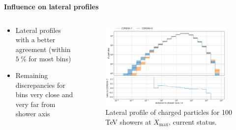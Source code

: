 \documentclass[aspectratio=1610, 9pt]{beamer}
\begin{document}
\begin{frame}
  \textbf{Influence on lateral profiles}
  \vspace{5mm}

      \begin{columns}[onlytextwidth]
        \begin{column}{0.4\textwidth}
            \begin{itemize}
              \item Lateral profiles with a better agreement (within $\SI{5}{\percent}$ for most bins)
              \item Remaining discrepancies for bins very close and very far from shower axis
            \end{itemize}
        \end{column}
        \begin{column}{0.6\textwidth}
            \begin{figure}
                \centering
                \includegraphics[width=0.95\textwidth]{plots/lateral_Charged_r_2023.png}
                \caption{Lateral profile of charged particles for 100 \si{\tera\electronvolt} showers at $X_\text{max}$, current status.}
            \end{figure}
        \end{column}
    \end{columns}

\end{frame}
\end{document}
